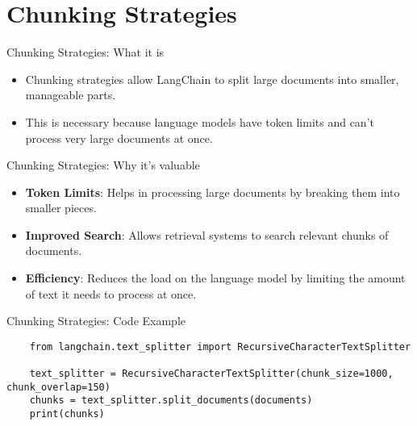 \documentclass{beamer}
\begin{document}
\section{Chunking Strategies}

\begin{frame}{Chunking Strategies: What it is}
    \begin{itemize}
        \item Chunking strategies allow LangChain to split large documents into smaller, manageable parts.
        \item This is necessary because language models have token limits and can't process very large documents at once.
    \end{itemize}
\end{frame}

\begin{frame}{Chunking Strategies: Why it's valuable}
    \begin{itemize}
        \item \textbf{Token Limits}: Helps in processing large documents by breaking them into smaller pieces.
        \item \textbf{Improved Search}: Allows retrieval systems to search relevant chunks of documents.
        \item \textbf{Efficiency}: Reduces the load on the language model by limiting the amount of text it needs to process at once.
    \end{itemize}
\end{frame}

\begin{frame}[fragile]{Chunking Strategies: Code Example}
    \begin{verbatim}
    from langchain.text_splitter import RecursiveCharacterTextSplitter

    text_splitter = RecursiveCharacterTextSplitter(chunk_size=1000, chunk_overlap=150)
    chunks = text_splitter.split_documents(documents)
    print(chunks)
    \end{verbatim}
\end{frame}

\end{document}
